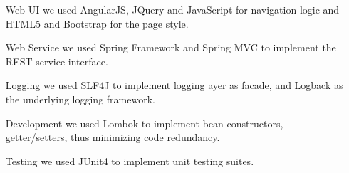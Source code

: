 \begin{itemize}
	\item[Web UI] we used AngularJS, JQuery and JavaScript for navigation logic and HTML5 and Bootstrap for the page style.
	
	\item[Web Service] we used Spring Framework and Spring MVC to implement the REST service interface.
	
	\item[Logging] we used SLF4J to implement logging ayer as facade, and Logback as the underlying logging framework.
	
	\item[Development] we used Lombok to implement bean constructors, getter/setters, thus minimizing code redundancy.
	
	\item[Testing] we used JUnit4 to implement unit testing suites.
\end{itemize}

